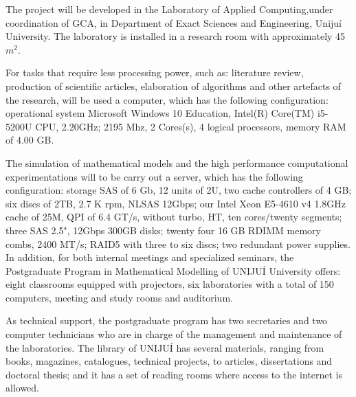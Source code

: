 \label{cap:infrastructure}
\noindent
The project will be developed in the Laboratory of Applied Computing,under coordination of GCA, in Department of Exact Sciences and Engineering, Uniju\'{i} University. The laboratory is installed in a research room with approximately 45 $m^2$.

For tasks that require less processing power, such as: literature review, production of scientific articles, elaboration of algorithms and other artefacts of the research,  will be used a computer, which has the following configuration: operational system Microsoft Windows 10 Education, Intel(R) Core(TM) i5-5200U CPU, 2.20GHz; 2195 Mhz, 2 Cores(s), 4 logical processors, memory RAM of 4.00 GB.

The simulation of mathematical models and the high performance computational experimentations will to be carry out a server, which has the following configuration: storage SAS of 6 Gb, 12 units of 2U, two cache controllers of 4 GB; six discs of 2TB, 2.7 K rpm, NLSAS 12Gbps; our Intel Xeon E5-4610 v4 1.8GHz cache of 25M, QPI of 6.4 GT/s, without turbo, HT, ten cores/twenty segments; three SAS 2.5", 12Gbps 300GB disks; twenty four 16 GB RDIMM memory combs, 2400 MT/s; RAID5 with three to six discs; two redundant power supplies.
In addition, for both internal meetings and specialized seminars, the Postgraduate Program in Mathematical Modelling of UNIJUÍ University offers: eight classrooms equipped with projectors, six laboratories with a total of 150 computers, meeting and study rooms and auditorium.

As technical support, the postgraduate program has two secretaries and two computer technicians who are in charge of the management and maintenance of the laboratories. The library of UNIJUÍ has several materials, ranging from books, magazines, catalogues, technical projects, to articles, dissertations and doctoral thesis; and it has a set of reading rooms where access to the internet is allowed.


